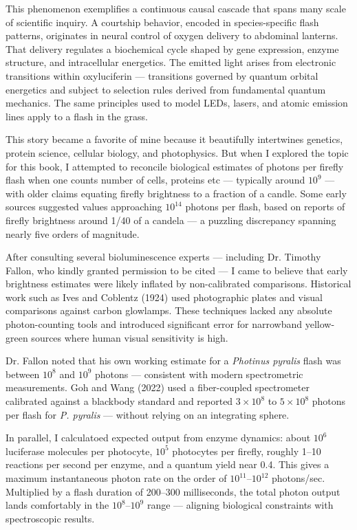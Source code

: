 This phenomenon exemplifies a continuous causal cascade that spans many scale of scientific inquiry. A courtship behavior, encoded in species-specific flash patterns, originates in neural control of oxygen delivery to abdominal lanterns. That delivery regulates a biochemical cycle shaped by gene expression, enzyme structure, and intracellular energetics. The emitted light arises from electronic transitions within oxyluciferin — transitions governed by quantum orbital energetics and subject to selection rules derived from fundamental quantum mechanics. The same principles used to model LEDs, lasers, and atomic emission lines apply to a flash in the grass.


\clearpage

\begin{commentary}
This story became a favorite of mine because it beautifully intertwines genetics, protein science, cellular biology, and photophysics. But when I explored the topic for this book, I attempted to reconcile biological estimates of photons per firefly flash when one counts number of cells, proteins etc — typically around $10^9$ — with older claims equating firefly brightness to a fraction of a candle. Some early sources suggested values approaching $10^{14}$ photons per flash, based on reports of firefly brightness around 1/40 of a candela — a puzzling discrepancy spanning nearly five orders of magnitude.

After consulting several bioluminescence experts — including Dr. Timothy Fallon, who kindly granted permission to be cited — I came to believe that early brightness estimates were likely inflated by non-calibrated comparisons. Historical work such as Ives and Coblentz (1924) used photographic plates and visual comparisons against carbon glowlamps. These techniques lacked any absolute photon-counting tools and introduced significant error for narrowband yellow-green sources where human visual sensitivity is high.

Dr. Fallon noted that his own working estimate for a \textit{Photinus pyralis} flash was between $10^8$ and $10^9$ photons — consistent with modern spectrometric measurements. Goh and Wang (2022) used a fiber-coupled spectrometer calibrated against a blackbody standard and reported $3 \times 10^8$ to $5 \times 10^8$ photons per flash for \textit{P. pyralis} — without relying on an integrating sphere.

In parallel, I calculatoed expected output from enzyme dynamics: about $10^6$ luciferase molecules per photocyte, $10^5$ photocytes per firefly, roughly 1–10 reactions per second per enzyme, and a quantum yield near 0.4. This gives a maximum instantaneous photon rate on the order of $10^{11}$–$10^{12}$ photons/sec. Multiplied by a flash duration of 200–300 milliseconds, the total photon output lands comfortably in the $10^8$–$10^9$ range — aligning biological constraints with spectroscopic results.


\end{commentary}
